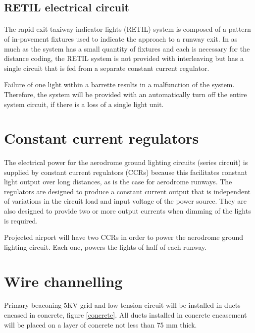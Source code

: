 		\subsection{RETIL electrical circuit}
		\paragraph{} The rapid exit taxiway indicator lights (RETIL) system is composed of a pattern of in-pavement fixtures used to indicate the approach to a runway exit. In as much as the system has a small quantity of fixtures and each is necessary for the distance coding, the RETIL system is not provided with interleaving but has a single circuit that is fed from a separate constant current regulator.
		
		Failure of one light within a barrette results in a malfunction of the system. Therefore, the system will be provided with an automatically turn off the entire system circuit, if there is a loss of a single light unit.
				
		
	\section{Constant current regulators}
	\paragraph{} The electrical power for the aerodrome ground lighting circuits (series circuit) is supplied by constant current regulators (CCRs) because this facilitates constant light output over long distances, as is the case for aerodrome runways. The regulators are designed to produce a constant current output that is independent of variations in the circuit load and input voltage of the power source. They are also designed to provide two or more output currents when
	dimming of the lights is required. 
	
	Projected airport will have two CCRs in order to power the aerodrome ground lighting circuit. Each one, powers the lights of half of each runway.
	
	
	\section{Wire channelling}
	\paragraph{} Primary beaconing 5KV grid and low tension circuit will be installed in  ducts encased in concrete, figure \ref{concrete}. All ducts installed in concrete encasement will be placed on a layer of concrete not less than 75 mm thick.
	
